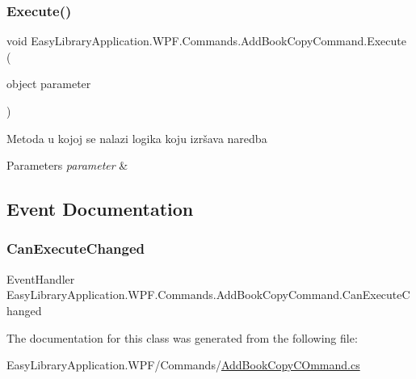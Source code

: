 \subsubsection{\texorpdfstring{Execute()}{Execute()}}
{\footnotesize\ttfamily void Easy\+Library\+Application.\+W\+P\+F.\+Commands.\+Add\+Book\+Copy\+Command.\+Execute (\begin{DoxyParamCaption}\item[{object}]{parameter }\end{DoxyParamCaption})}



Metoda u kojoj se nalazi logika koju izršava naredba 


\begin{DoxyParams}{Parameters}
{\em parameter} & \\
\hline
\end{DoxyParams}


\subsection{Event Documentation}
\mbox{\label{class_easy_library_application_1_1_w_p_f_1_1_commands_1_1_add_book_copy_command_a74aa52808b100435c8e276bd511af630}} 
\subsubsection{\texorpdfstring{Can\+Execute\+Changed}{CanExecuteChanged}}
{\footnotesize\ttfamily Event\+Handler Easy\+Library\+Application.\+W\+P\+F.\+Commands.\+Add\+Book\+Copy\+Command.\+Can\+Execute\+Changed}



The documentation for this class was generated from the following file\+:\begin{DoxyCompactItemize}
\item 
Easy\+Library\+Application.\+W\+P\+F/\+Commands/\mbox{\hyperlink{_add_book_copy_c_ommand_8cs}{Add\+Book\+Copy\+C\+Ommand.\+cs}}\end{DoxyCompactItemize}
